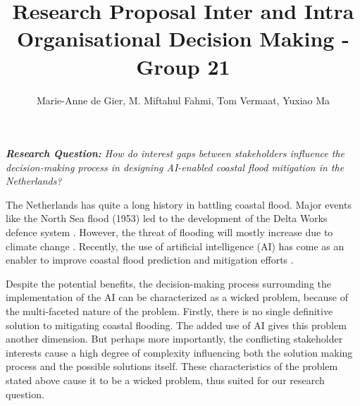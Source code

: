 \documentclass[UTF8,a4paper,AutoFakeBold,AutoFakeSlant]{article}
\title{\textbf{\textsf{{\textsf{Research Proposal Inter and Intra Organisational Decision Making - Group 21}}}}}
\author{\tnewroman Marie-Anne de Gier, M. Miftahul Fahmi, Tom Vermaat, Yuxiao Ma}
\date{}
\makeatletter
\renewcommand{\abstractname}{}    %
\renewenvironment{abstract}{%
    \if@twocolumn
    \subsection*{\abstractname}%
    \else
    \small
    \begin{center}%
        {\bfseries \abstractname\vspace{-.5em}\vspace{\z@}}%
    \end{center}%
    \fi}
    {}
\makeatother
\begin{document}
\setlength{\abovedisplayskip}{1pt}

\maketitle


\begin{abstract}
\noindent \textit{\textbf{Research Question:} How do interest gaps between stakeholders influence the decision-making process in designing AI-enabled coastal flood mitigation in the Netherlands?}
\end{abstract}

\vspace{1em}

The Netherlands has quite a long history in battling coastal flood. Major events like the North Sea flood (1953) led to the development of the Delta Works defence system \cite{husby2013}. However, the threat of flooding will mostly increase due to climate change \cite{nicholls2007}. Recently, the use of artificial intelligence (AI) has come as an enabler to improve coastal flood prediction and mitigation efforts \cite{saravi2019}.

Despite the potential benefits, the decision-making process surrounding the implementation of the AI can be characterized as a wicked problem, because of the multi-faceted nature of the problem. Firstly, there is no single definitive solution to mitigating coastal flooding. The added use of AI gives this problem another dimension. But perhaps more importantly, the conflicting stakeholder interests cause a high degree of complexity influencing both the solution making process and the possible solutions itself.  These characteristics of the problem stated above cause it to be a wicked problem, thus suited for our research question. 
\end{document}
